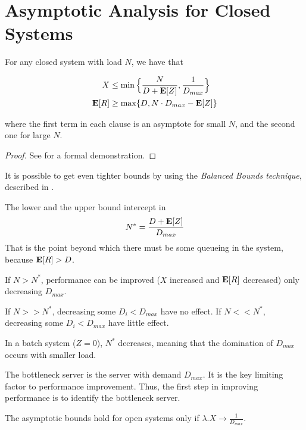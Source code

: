 \section{Asymptotic Analysis for Closed Systems}
\label{sec:Asymptotic-Analysis-Closed-Systems}

\begin{theorem}
	\label{thm:Asymptotic-Bounds-Closed-Systems}
	For any closed system with load $N$, we have that
	
	\begin{equation}
	\label{eqn:Asymptotic-Bounds-Closed-Systems}
	\begin{split}
	X & \leq \min \Big\{ \frac{N}{D + \expected{Z}} , \frac{1}{D_{max}} \Big\} \\
	\expected{R} & \geq \max\{D , N \cdot D_{max} - \expected{Z} \}
	\end{split}
	\end{equation}
	
	where the first term in each clause is an asymptote for small $N$, and the second one for large $N$.
	
	\begin{proof}
		See \cite{harchol2013performance} for a formal demonstration.
	\end{proof}
\end{theorem}

It is possible to get even tighter bounds by using the \textit{Balanced Bounds technique}, described in \cite{lazowska1984quantitative}.

The lower and the upper bound intercept in 
\begin{equation}
\label{eqn:Asymptotic-Bounds-Closed-Systems-Interception}
N^{*} = \frac{D + \expected{Z}}{D_{max}}
\end{equation}
That is the point beyond which there must be some queueing in the system, because $\mathbf{E}[R] > D$.

If $N > N^{*}$, performance can be improved ($X$ increased and $\mathbf{E}[R]$ decreased) only decreasing $D_{max}$.

If $N >> N^{*}$, decreasing some $D_{i} < D_{max}$ have no effect.
If $N << N^{*}$, decreasing some $D_{i} < D_{max}$ have little effect.

In a batch system ($Z=0$), $N^{*}$ decreases, meaning that the domination of $D_{max}$ occurs with smaller load.

The bottleneck server is the server with demand $D_{max}$. It is the key limiting factor to performance improvement. Thus, the first step in improving performance is to identify the bottleneck server.

The asymptotic bounds hold for open systems only if $\lambda . X \rightarrow \frac{1}{D_{max}}$.